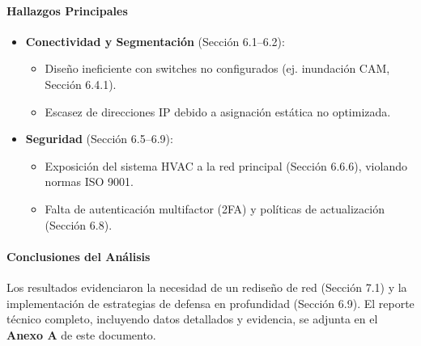 \paragraph{Hallazgos Principales}
\begin{itemize}
	\item \textbf{Conectividad y Segmentación} (Sección 6.1–6.2):
	\begin{itemize}
		\item Diseño ineficiente con switches no configurados (ej. inundación CAM, Sección 6.4.1).
		\item Escasez de direcciones IP debido a asignación estática no optimizada.
	\end{itemize}
	
	\item \textbf{Seguridad} (Sección 6.5–6.9):
	\begin{itemize}
		\item Exposición del sistema HVAC a la red principal (Sección 6.6.6), violando normas ISO 9001.
		\item Falta de autenticación multifactor (2FA) y políticas de actualización (Sección 6.8).
	\end{itemize}
\end{itemize}

\paragraph{Conclusiones del Análisis}
Los resultados evidenciaron la necesidad de un rediseño de red (Sección 7.1) y la implementación de estrategias de defensa en profundidad (Sección 6.9). El reporte técnico completo, incluyendo datos detallados y evidencia, se adjunta en el \textbf{Anexo A} de este documento.